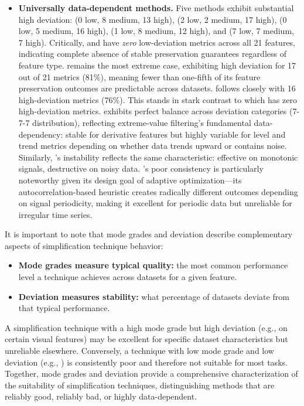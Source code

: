 \begin{itemize}
    \item \textbf{Universally data-dependent methods.} Five methods exhibit substantial high deviation: \methodMin{} (0 low, 8 medium, 13 high), \methodFPCS{} (2 low, 2 medium, 17 high), \methodASAP{} (0 low, 5 medium, 16 high), \methodTDA{} (1 low, 8 medium, 12 high), and \methodMax{} (7 low, 7 medium, 7 high). Critically, \methodMin{} and \methodASAP{} have \emph{zero} low-deviation metrics across all 21 features, indicating complete absence of stable preservation guarantees regardless of feature type. \methodFPCS{} remains the most extreme case, exhibiting high deviation for 17 out of 21 metrics (81\%), meaning fewer than one-fifth of its feature preservation outcomes are predictable across datasets. \methodASAP{} follows closely with 16 high-deviation metrics (76\%). This stands in stark contrast to \methodGau{} which has zero high-deviation metrics. \methodMax{} exhibits perfect balance across deviation categories (7-7-7 distribution), reflecting extreme-value filtering's fundamental data-dependency: stable for derivative features but highly variable for level and trend metrics depending on whether data trends upward or contains noise. Similarly, \methodMin{}'s instability reflects the same characteristic: effective on monotonic signals, destructive on noisy data. \methodASAP{}'s poor consistency is particularly noteworthy given its design goal of adaptive optimization---its autocorrelation-based heuristic creates radically different outcomes depending on signal periodicity, making it excellent for periodic data but unreliable for irregular time series.
\end{itemize}

It is important to note that mode grades and deviation describe complementary aspects of simplification technique behavior:
\begin{itemize}
    \item \textbf{Mode grades measure typical quality:} the most common performance level a technique achieves across datasets for a given feature.
    \item \textbf{Deviation measures stability:} what percentage of datasets deviate from that typical performance.
\end{itemize}

A simplification technique with a high mode grade but high deviation (e.g., \methodMed{} on certain visual features) may be excellent for specific dataset characteristics but unreliable elsewhere. Conversely, a technique with low mode grade and low deviation (e.g., \methodDP{}) is consistently poor and therefore not suitable for most tasks. Together, mode grades and deviation provide a comprehensive characterization of the suitability of simplification techniques, distinguishing methods that are reliably good, reliably bad, or highly data-dependent.
